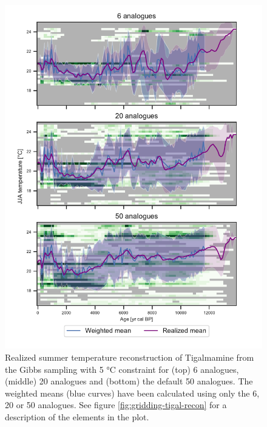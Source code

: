 \documentclass[
11pt, %
english, %
singlespacing, %
headsepline, %
]{MastersDoctoralThesis} %
\begin{document}
\begin{NoHyper}
\begin{refsection}
\begin{figure}
\includegraphics[width=\linewidth]{gridding-figures/realized-temperature-tigalmamine-kanalogues.pdf}
\caption[Realized summer temperature reconstruction of Tigalmamine with different analogues]{Realized summer temperature reconstruction of Tigalmamine from the Gibbs sampling with 5 °C constraint for (top) 6 analogues, (middle) 20 analogues and (bottom) the default 50 analogues. The weighted means (blue curves) have been calculated using only the 6, 20 or 50 analogues. See figure \ref{fig:gridding-tigal-recon} for a description of the elements in the plot.}
\label{fig:gridding-tigal-recon-k}
\end{figure}


\end{refsection}
\end{NoHyper}
\end{document}
